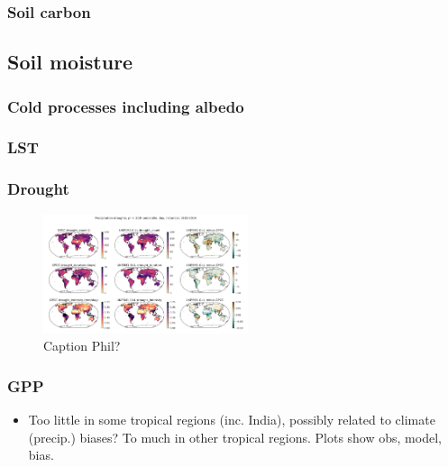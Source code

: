 \subsubsection{Soil carbon}

\subsection{Soil moisture}

\subsubsection{Cold processes including albedo}

\subsubsection{LST}

\subsubsection{Drought}
\begin{figure}[t]
    \includegraphics[width=6cm]{figs/drought.png}
    \caption{Caption Phil? \label{fig:drought} }
\end{figure}










\subsubsection{GPP}
\begin{itemize}
    \item Too little in some tropical regions (inc. India), possibly related to climate (precip.) biases? To much in other tropical regions. Plots show obs, model, bias.
\end{itemize}

